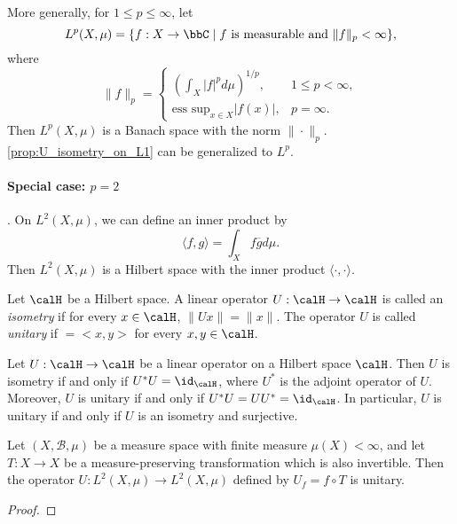     More generally, for \(1 \leq p \leq \infty\), let
    \[ L^p(X, \mu) = \{ f: X \to \bbC \mid f \text{ is measurable and } \|f\|_p < \infty \}, \]
    where
    \[
        \|f\|_p = \begin{cases}
            \left( \int_X |f|^p d\mu \right)^{1/p}, & 1 \leq p < \infty, \\
            \text{ess sup}_{x \in X} |f(x)|, & p = \infty.
        \end{cases}
    \]
    Then \(L^p(X, \mu)\) is a Banach space with the norm \(\|\cdot\|_p\).
    \cref{prop:U_isometry_on_L1} can be generalized to \(L^p\).

    \paragraph{Special case: \(p=2\)}. On \(L^2(X, \mu)\), we can define an inner product by
    \[ \langle f, g \rangle = \int_X f \overline{g} d\mu. \]
    Then \(L^2(X, \mu)\) is a Hilbert space with the inner product \(\langle \cdot, \cdot \rangle\).

    \begin{definition}\label{def:unitary_operator}
        Let \(\calH\) be a Hilbert space.
        A linear operator \(U: \calH \to \calH\) is called an \emph{isometry} if for every \(x \in \calH\), \(\|Ux\| = \|x\|\).
        The operator \(U\) is called \emph{unitary} if \(<Ux, Uy> = <x, y>\) for every \(x, y \in \calH\).
    \end{definition}

    \begin{proposition}\label{prop:unitary_iff_isometry_and_surjective}
        Let \(U: \calH \to \calH\) be a linear operator on a Hilbert space \(\calH\).
        Then \(U\) is isometry if and only if \(U^* U = \id_\calH\), where \(U^*\) is the adjoint operator of \(U\).
        Moreover, \(U\) is unitary if and only if \(U^* U = U U^* = \id_\calH\).
        In particular, \(U\) is unitary if and only if \(U\) is an isometry and surjective.
    \end{proposition}

    \begin{proposition}\label{prop:U_is_unitary_on_L2}
        Let \((X, \mathcal{B}, \mu)\) be a measure space with finite measure \(\mu(X) < \infty\), and let \(T: X \to X\) be a measure-preserving transformation which is also invertible.
        Then the operator \(U: L^2(X, \mu) \to L^2(X, \mu)\) defined by \(U_f = f \circ T\) is unitary.
    \end{proposition}
    \begin{proof}
    \end{proof}

